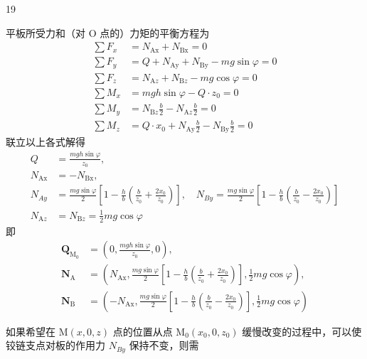 \begin{solution}{19}
\begin{subsolution}
        平板所受力和（对 O 点的）力矩的平衡方程为
        \begin{align}
            \sum F_x &= N_{\mathrm{Ax}} + N_{\mathrm{Bx}} = 0 \label{eq:1.s19} \\
            \sum F_y &= Q + N_{\mathrm{Ay}} + N_{\mathrm{By}} - mg\sin\varphi = 0 \label{eq:2.s19} \\
            \sum F_z &= N_{\mathrm{A}z} + N_{\mathrm{B}z} - mg\cos\varphi = 0 \label{eq:3.s19} \\
            \sum M_x &= mgh\sin\varphi - Q \cdot z_0 = 0 \label{eq:4.s19} \\
            \sum M_y &= N_{\mathrm{B}z}\frac{b}{2} - N_{\mathrm{A}z}\frac{b}{2} = 0 \label{eq:5.s19} \\
            \sum M_z &= Q \cdot x_0 + N_{\mathrm{Ay}}\frac{b}{2} - N_{\mathrm{By}}\frac{b}{2} = 0 \label{eq:6.s19}
        \end{align}
        联立以上各式解得
        \begin{align*}
            Q &= \frac{mgh\sin\varphi}{z_0}, \\
            N_{\mathrm{Ax}} &= -N_{\mathrm{Bx}}, \\
            N_{Ay} &= \frac{mg\sin\varphi}{2}\left[1 - \frac{h}{b}\left(\frac{b}{z_0} + \frac{2x_0}{z_0}\right)\right], \quad N_{By} = \frac{mg\sin\varphi}{2}\left[1 - \frac{h}{b}\left(\frac{b}{z_0} - \frac{2x_0}{z_0}\right)\right] \\
            N_{\mathrm{A}z} &= N_{\mathrm{B}z} = \frac{1}{2}mg\cos\varphi
        \end{align*}
        即
        \begin{align}
            \boldsymbol{Q}_{\mathrm{M}_0} &= (0, \frac{mgh\sin\varphi}{z_0}, 0), \label{eq:7.s19} \\
            \boldsymbol{N}_{\mathrm{A}} &= \left(N_{\mathrm{Ax}}, \frac{mg\sin\varphi}{2}\left[1 - \frac{h}{b}\left(\frac{b}{z_0} + \frac{2x_0}{z_0}\right)\right], \frac{1}{2}mg\cos\varphi\right), \label{eq:8.s19} \\
            \boldsymbol{N}_{\mathrm{B}} &= \left(-N_{\mathrm{Ax}}, \frac{mg\sin\varphi}{2}\left[1 - \frac{h}{b}\left(\frac{b}{z_0} - \frac{2x_0}{z_0}\right)\right], \frac{1}{2}mg\cos\varphi\right) \label{eq:9.s19}
        \end{align}
    \end{subsolution}
    \begin{subsolution}
        如果希望在 $\mathrm{M}(x,0,z)$ 点的位置从点 $\mathrm{M}_0(x_0,0,z_0)$ 缓慢改变的过程中，可以使铰链支点对板的作用力 $N_{By}$ 保持不变，则需

\end{subsolution}
\end{solution}

